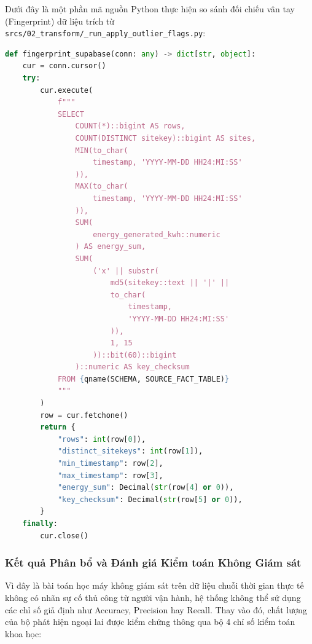 \documentclass[12pt, a4paper]{report}
\begin{document}
Dưới đây là một phần mã nguồn Python thực hiện so sánh đối chiếu vân tay (Fingerprint) dữ liệu trích từ \texttt{srcs/02\_transform/\_run\_apply\_outlier\_flags.py}:

\begin{lstlisting}[language=Python, caption={Mã nguồn Python kiểm tra vân tay dữ liệu (Fingerprint) trước khi cập nhật}, label={lst:data_fingerprint}]
def fingerprint_supabase(conn: any) -> dict[str, object]:
    cur = conn.cursor()
    try:
        cur.execute(
            f"""
            SELECT
                COUNT(*)::bigint AS rows,
                COUNT(DISTINCT sitekey)::bigint AS sites,
                MIN(to_char(
                    timestamp, 'YYYY-MM-DD HH24:MI:SS'
                )),
                MAX(to_char(
                    timestamp, 'YYYY-MM-DD HH24:MI:SS'
                )),
                SUM(
                    energy_generated_kwh::numeric
                ) AS energy_sum,
                SUM(
                    ('x' || substr(
                        md5(sitekey::text || '|' || 
                        to_char(
                            timestamp, 
                            'YYYY-MM-DD HH24:MI:SS'
                        )),
                        1, 15
                    ))::bit(60)::bigint
                )::numeric AS key_checksum
            FROM {qname(SCHEMA, SOURCE_FACT_TABLE)}
            """
        )
        row = cur.fetchone()
        return {
            "rows": int(row[0]),
            "distinct_sitekeys": int(row[1]),
            "min_timestamp": row[2],
            "max_timestamp": row[3],
            "energy_sum": Decimal(str(row[4] or 0)),
            "key_checksum": Decimal(str(row[5] or 0)),
        }
    finally:
        cur.close()
\end{lstlisting}

\subsubsection{Kết quả Phân bổ và Đánh giá Kiểm toán Không Giám sát}
Vì đây là bài toán học máy không giám sát trên dữ liệu chuỗi thời gian thực tế không có nhãn sự cố thủ công từ người vận hành, hệ thống không thể sử dụng các chỉ số giả định như Accuracy, Precision hay Recall. Thay vào đó, chất lượng của bộ phát hiện ngoại lai được kiểm chứng thông qua bộ 4 chỉ số kiểm toán khoa học:
\end{document}
